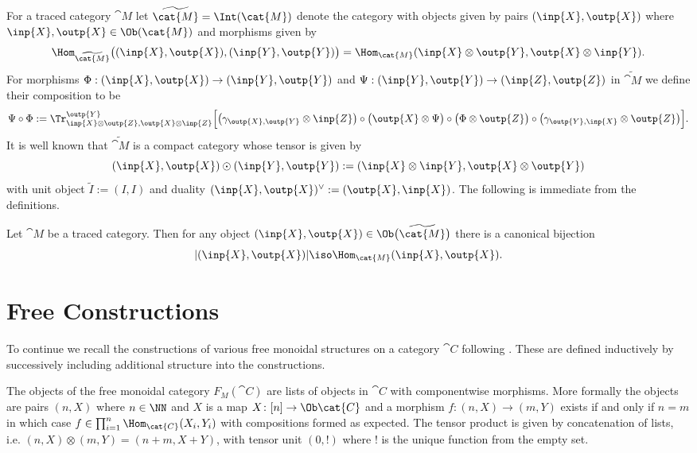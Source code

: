 For a traced category $\cat{M}$ let $\widetilde{\cat{M}}=\Int(\cat{M})$ denote the category with objects given by pairs $(\inp{X},\outp{X})$ where $\inp{X},\outp{X}\in \Ob(\cat{M})$ and morphisms given by 
\[\Hom_{\widetilde{\cat{M}}}\big((\inp{X},\outp{X}),(\inp{Y},\outp{Y})\big)=\Hom_{\cat{M}}(\inp{X}\otimes \outp{Y},\outp{X}\otimes \inp{Y}).\]
For morphisms $\Phi:(\inp{X},\outp{X})\to(\inp{Y},\outp{Y})$ and $\Psi:(\inp{Y},\outp{Y})\to(\inp{Z},\outp{Z})$ in $\widetilde{\cat{M}}$ we define their composition to be
\[\Psi\circ\Phi:=\Tr^{\outp{Y}}_{\inp{X}\otimes \outp{Z},\outp{X}\otimes \inp{Z}}\Big[\big(\gamma_{\outp{X},\outp{Y}}\otimes \inp{Z}\big)\circ\big(\outp{X}\otimes\Psi\big)\circ\big(\Phi\otimes \outp{Z}\big)\circ\big(\gamma_{\outp{Y},\inp{X}}\otimes \outp{Z}\big)\Big].\]
It is well known that $\widetilde{\cat{M}}$ is a compact  category whose tensor is given by
\[(\inp{X},\outp{X})\odot(\inp{Y},\outp{Y}):=(\inp{X}\otimes \inp{Y},\outp{X}\otimes \outp{Y})\]
with unit object $\tilde I:=(I,I)$ and duality $(\inp{X},\outp{X})^\vee:=(\outp{X},\inp{X})$.  The following is immediate from the definitions.

\begin{lemma}

Let $\cat{M}$ be a traced category.  Then for any object $(\inp{X},\outp{X})\in\Ob\big(\widetilde{\cat{M}}\big)$ there is a canonical bijection
\[|(\inp{X},\outp{X})|\iso\Hom_{\cat{M}}(\inp{X},\outp{X}).\]

\end{lemma}

\section{Free Constructions}

To continue we recall the constructions of various free monoidal structures on a category $\cat{C}$ following \cite{abramsky}.  These are defined inductively by successively including additional structure into the constructions.

The objects of the free monoidal category $F_M(\cat{C})$ are lists of objects in $\cat{C}$ with componentwise morphisms.  More formally the objects are pairs $(n,X)$ where $n\in\NN$ and $X$ is a map $X\colon[n]\to \Ob\cat{C}$ and a morphism $f:(n,X)\to(m,Y)$ exists if and only if $n=m$ in which case $f\in\prod_{i=1}^n\Hom_{\cat{C}}(X_i,Y_i)$ with compositions formed as expected.  The tensor product is given by concatenation of lists, i.e. $(n,X)\otimes(m,Y)=(n+m,X+Y)$, with tensor unit $(0,!)$ where $!$ is the unique function from the empty set.

